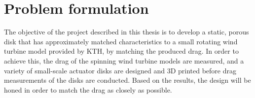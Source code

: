 \section{Problem formulation}
The objective of the project described in this thesis is to develop a static, porous disk that has approximately matched characteristics to a small rotating wind turbine model provided by KTH, by matching the produced drag. In order to achieve this, the drag of the spinning wind turbine models are measured, and a variety of small-scale actuator disks are designed and 3D printed before drag measurements of the disks are conducted. Based on the results, the design will be honed in order to match the drag as closely as possible. 

